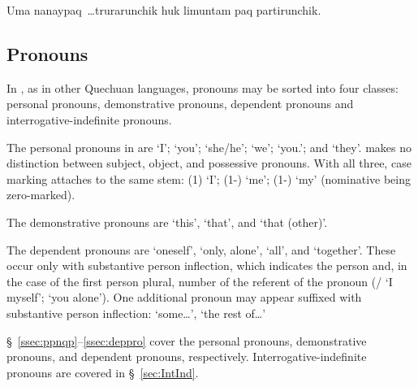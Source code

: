 %
{Uma nanaypaq~\dots{}trurarunchik huk limuntam paq partirunchik.}%
{}%
{}{}%

\subsection{Pronouns}
In \SYQ{}, as in other Quechuan languages, pronouns may be sorted into four classes: personal pronouns, demonstrative pronouns, dependent pronouns and interroga\-tive-indefinite pronouns.

The personal pronouns in \SYQ{} are  `I';  `you';  `she/he';  `we';  `you.'; and  `they'. \SYQ{} makes no distinction between subject, object, and possessive pronouns. With all three, case marking attaches to the same stem:  (1) `I';  (1-) `me';  (1-) `my' (nominative being zero-marked).

The demonstrative pronouns are  `this',  `that', and  `that (other)'.

The dependent pronouns are  `oneself',  `only, alone',  `all', and  `together'. These occur only with substantive person inflection, which indicates the person and, in the case of the first person plural, number of the referent of the pronoun (/\phono{-:} `I myself';  `you alone'). One additional pronoun may appear suffixed with substantive person inflection:  `some\dots', `the rest of\dots'

\S~\ref{ssec:ppnqp}--\ref{ssec:deppro} cover the personal pronouns, demonstrative pronouns, and dependent pronouns, respectively. Interrogative-indefinite pronouns are covered in \S~\ref{sec:IntInd}.

